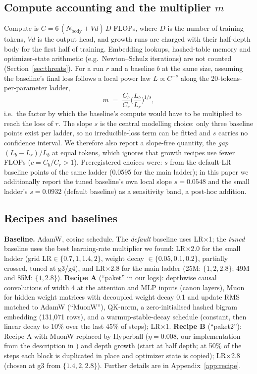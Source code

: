 \documentclass[11pt]{article}
\begin{document}
\subsection{Compute accounting and the multiplier \texorpdfstring{$m$}{m}}
Compute is $C=6\,(N_{\text{body}}+V d)\,D$ FLOPs, where $D$ is the number of training tokens, $V d$ is the output head, and growth runs are charged with their half-depth body for the first half of training.
Embedding lookups, hashed-table memory and optimizer-state arithmetic (e.g.\ Newton--Schulz iterations) are not counted (Section~\ref{sec:threats}).
For a run $r$ and a baseline $b$ at the same size, assuming the baseline's final loss follows a local power law $L\propto C^{-s}$ along the 20-tokens-per-parameter ladder,
\begin{equation}
m \;=\; \frac{C_b}{C_r}\Big(\frac{L_b}{L_r}\Big)^{1/s},
\end{equation}
i.e.\ the factor by which the baseline's compute would have to be multiplied to reach the loss of $r$.
The slope $s$ is the central modelling choice: only three baseline points exist per ladder, so no irreducible-loss term can be fitted and $s$ carries no confidence interval.
We therefore also report a slope-free quantity, the \emph{gap} $(L_b-L_r)/L_b$ at equal tokens, which ignores that growth recipes use fewer FLOPs ($c=C_b/C_r>1$).
Preregistered choices were: $s$ from the default-LR baseline points of the same ladder (0.0595 for the main ladder); in this paper we additionally report the tuned baseline's own local slope $s=0.0548$ and the small ladder's $s=0.0932$ (default baseline) as a sensitivity band, a post-hoc addition.

\subsection{Recipes and baselines}
\textbf{Baseline.} AdamW, cosine schedule. The \emph{default} baseline uses LR$\times$1; the \emph{tuned} baseline uses the best learning-rate multiplier we found: LR$\times$2.0 for the small ladder (grid LR$\in\{0.7,1,1.4,2\}$, weight decay $\in\{0.05,0.1,0.2\}$, partially crossed, tuned at g3/g4), and LR$\times$2.8 for the main ladder (25M: $\{1,2,2.8\}$; 49M and 85M: $\{1,2.8\}$).
\textbf{Recipe A} (``paket'' in our logs): depthwise causal convolutions of width 4 at the attention and MLP inputs (canon layers), Muon for hidden weight matrices with decoupled weight decay 0.1 and update RMS matched to AdamW (``MuonW''), QK-norm, a zero-initialised hashed bigram embedding (131{,}071 rows), and a warmup-stable-decay schedule (constant, then linear decay to 10\% over the last 45\% of steps); LR$\times$1.
\textbf{Recipe B} (``paket2''): Recipe A with MuonW replaced by Hyperball ($\eta=0.008$, our implementation from the description in \citet{wen2026hyperball}) and depth growth (start at half depth; at 50\% of the steps each block is duplicated in place and optimizer state is copied); LR$\times$2.8 (chosen at g3 from $\{1.4,2,2.8\}$).
Further details are in Appendix~\ref{app:recipe}.
\end{document}
